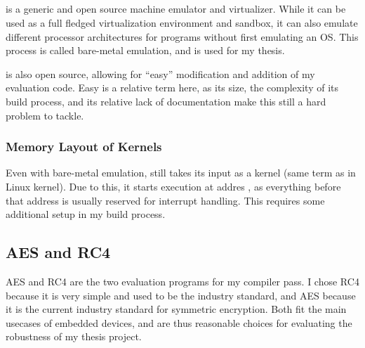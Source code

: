 \subsection{\qemu{}}
\label{qemu}
\qemu{} is a generic and open source machine emulator and virtualizer.\cite{bellard2005qemu}
While it can be used as a full fledged virtualization environment and sandbox, it can also emulate different processor architectures for programs without first emulating an OS.
This process is called bare-metal emulation, and is used for my thesis.

\qemu{} is also open source, allowing for ``easy'' modification and addition of my evaluation code.
Easy is a relative term here, as its size, the complexity of its build process, and its relative lack of documentation make this still a hard problem to tackle.

\subsubsection{Memory Layout of \qemu{} Kernels}
\label{memory}
Even with bare-metal emulation, \qemu{} still takes its input as a kernel (same term as in Linux kernel).
Due to this, it starts execution at addres , as everything before that address is usually reserved for interrupt handling.
This requires some additional setup in my build process.

\subsection{AES and RC4}
AES\cite{daemen2013design} and RC4\cite{rc4} are the two evaluation programs for my compiler pass.
I chose RC4 because it is very simple and used to be the industry standard, and AES because it is the current industry standard for symmetric encryption.
Both fit the main usecases of embedded devices, and are thus reasonable choices for evaluating the robustness of my thesis project.
